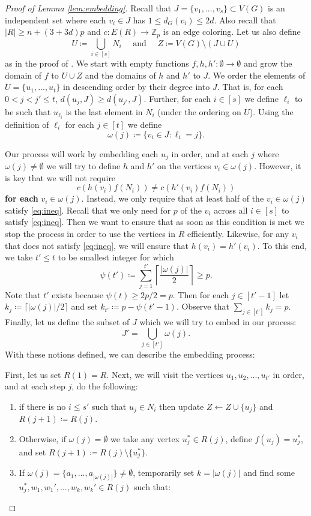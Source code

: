 \documentclass{article}
\newcommand\ZZ{{\mathbb Z}}
\theoremstyle{definition}
\begin{document}
\begin{proof}[Proof of Lemma \ref{lem:embedding}]

Recall that $J=\{v_1,...,v_{s}\}\subset V(G)$ is an independent set where each $v_i\in J$ has $1\leq d_G(v_i)\leq 2d$. Also recall that $|R|\geq n+(3+3d)p$ and $c:E(R)\to \ZZ_p$ is an edge coloring. Let us also  define $$U\coloneqq \bigcup_{i\in [s]}N_i  \quad \text{ and } \quad Z\coloneqq V(G)\setminus (J\cup U)$$ as in the proof of . 
We start with empty functions $f,h,h':\emptyset \to \emptyset$ and grow the domain of $f$ to $U\cup Z$ and the domains of $h$ and $h'$ to $J$. We order the elements of $U=\{u_1,...,u_t\}$ in descending order by their degree into $J$. That is, for each $0<j<j'\leq t$, $d(u_j,J)\geq d(u_{j'},J)$. Further, for each $i\in [s]$ we define $\ell_i$ to be such that $u_{\ell_i}$ is the last element in $N_i$ (under the ordering on $U$). Using the definition of $\ell_i$ for each $j\in [t]$ we define $$\omega(j)\coloneqq \{v_i\in J:\ell_i=j\}.$$

Our process will work by embedding each $u_j$ in order, and at each $j$ where $\omega(j)\neq \emptyset$ we will try to define $h$ and $h'$ on the vertices $v_i\in \omega(j)$. However, it is key that we will not require 
\begin{equation}\label{eq:ineq}
c(h(v_i)f(N_{i}))\neq c(h'(v_i)f(N_i))
\end{equation}
\textbf{for each} $v_i\in \omega(j)$. Instead, we only require that at least half of the $v_i\in \omega(j)$ satisfy \cref{eq:ineq}. Recall that we only need for $p$ of the $v_i$ across all $i\in [s]$ to satisfy \cref{eq:ineq}. Then we want to ensure that as soon as this condition is met we stop the process in order to use the vertices in $R$ efficiently. Likewise, for any $v_i$ that does not satisfy \cref{eq:ineq}, we will ensure that $h(v_i)=h'(v_i)$. To this end, we take $t'\leq t$ to be smallest integer for which  $$\psi(t')\coloneqq\sum_{j=1}^{t'}\left\lceil\frac{|\omega(j)|}{2}\right\rceil\geq p.$$ Note that $t'$ exists because $\psi(t)\geq 2p/2 =p$. Then for each $j\in[t'-1]$ let $k_j\coloneqq \lceil |\omega(j)|/2\rceil$ and set $k_{t'}\coloneqq p-\psi(t'-1)$. Observe that $\sum_{j\in[t']}k_j = p$. Finally, let us define the subset of $J$ which we will try to embed in our process: $$J'=\bigcup_{j\in [t']}\omega(j).$$ With these notions defined, we can describe the embedding process:

First, let us set $R(1)=R$. Next, we will visit the vertices $u_1,u_2,...,u_{t'}$ in order, and at each step $j$, do the following:
\begin{enumerate}
    \item if there is no $i\leq s'$ such that $u_j\in N_i$ then update $Z\gets Z\cup \{u_j\} $ and $R(j+1)\coloneqq R(j)$. 
    \item Otherwise, if $\omega(j)=\emptyset$ we take any vertex $u_j^*\in R(j)$, define $f(u_j)=u_j^*$, and set $R({j+1})\coloneqq R(j)\setminus \{u_j^*\}$.
    \item If $\omega(j)=\{a_1,...,a_{|\omega(j)|}\}\neq \emptyset$, temporarily set $k=|\omega(j)|$ and find some $u_j^*,w_1,w_1',...,w_k,w_k'\in R(j)$ such that:
    

\end{enumerate}
\end{proof}
\end{document}
